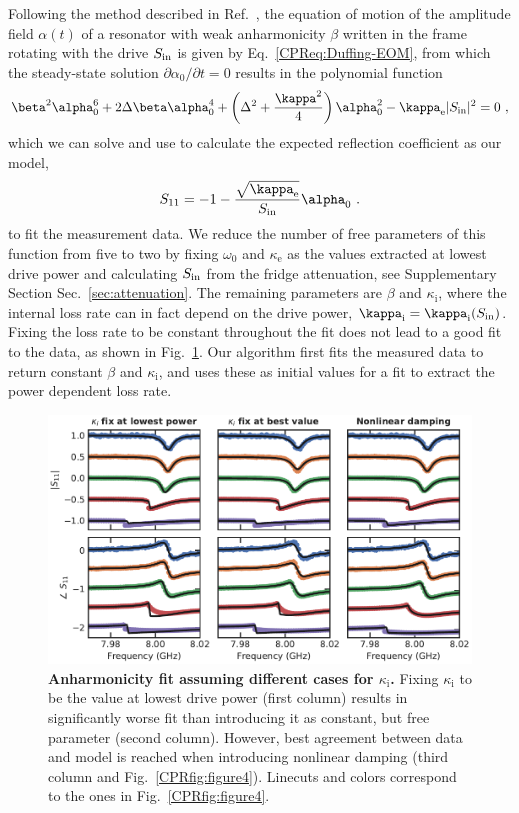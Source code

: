 Following the method described in Ref.~\cite{schmidtCurrentDetectionUsing2020}, the equation of motion of the amplitude field $\alpha(t)$ of a resonator with weak anharmonicity $\beta$ written in the frame rotating with the drive $S_{\rm in}$ is given by Eq.~\ref{CPReq:Duffing-EOM}, from which the steady-state solution $\partial\alpha_0/\partial t=0$ results in the polynomial function
% 
\begin{align}
\beta^2 \alpha_0^6 + 2\Delta\beta\alpha_0^4 + \left(\Delta^2+\frac{\kappa^2}{4}\right)\alpha_0^2 - \kappa_\text{e} \abs{S_{\rm in}}^2 = 0\ ,
\label{CPReq:polynom}
\end{align}
%
which we can solve and use to calculate the expected reflection coefficient as our model,
\begin{align}
S_{11}=-1-\frac{\sqrt{\kappa_\text{e}}}{S_{\rm in}}\alpha_0\ .
\label{CPReq:S11anh}
\end{align}
%
to fit the measurement data.
%
We reduce the number of free parameters of this function from five to two by fixing $\omega_0$ and $\kappa_\text{e}$ as the values extracted at lowest drive power and calculating $S_{\rm in}$ from the fridge attenuation, see Supplementary Section Sec.~\ref{sec:attenuation}.
%
The remaining parameters are $\beta$ and $\kappa_\text{i}$, where the internal loss rate can in fact depend on the drive power, $\kappa_\text{i}=\kappa_\text{i}(S_{\rm in})$.
%
Fixing the loss rate to be constant throughout the fit does not lead to a good fit to the data, as shown in Fig.~\ref{CPRfig:SMpower}.
%
Our algorithm first fits the measured data to return constant $\beta$ and $\kappa_\text{i}$, and uses these as initial values for a fit to extract the power dependent loss rate.

\begin{figure}
	\centering
	\includegraphics[width=\linewidth]{chapter-gJJ-CPR/figs/SMFigure-power}
	\caption{
		\textbf{Anharmonicity fit assuming different cases for $\kappa_\text{i}$.}
		Fixing $\kappa_\text{i}$ to be the value at lowest drive power (first column) results in significantly worse fit than introducing it as constant, but free parameter (second column).
		However, best agreement between data and model is reached when introducing nonlinear damping (third column and Fig.~\ref{CPRfig:figure4}).
		Linecuts and colors correspond to the ones in Fig.~\ref{CPRfig:figure4}.
	}
	\label{CPRfig:SMpower}
\end{figure}

